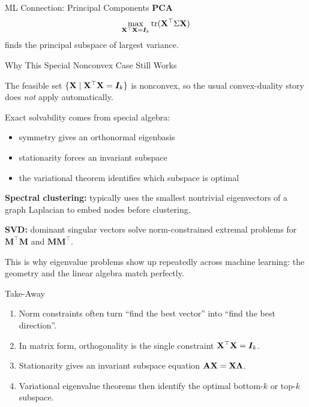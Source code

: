 \documentclass[11pt,compress,t,notes=noshow, xcolor=table]{beamer}
\newcommand{\Lambdamat}{\bm{\Lambda}}
\begin{document}
\begin{framev}[fs=small]{ML Connection: Principal Components}
\textbf{PCA}
$$
\max_{\mathbf{X}^\top \mathbf{X} = \bm{I}_k} \operatorname{tr}(\mathbf{X}^\top \Sigma \mathbf{X})
$$
finds the principal subspace of largest variance.\\
\spacer
{}
\end{framev}


\begin{framei}[fs=small]{Why This Special Nonconvex Case Still Works}
\item The feasible set $\{\mathbf{X} \mid \mathbf{X}^\top \mathbf{X} = \bm{I}_k\}$ is nonconvex, so the usual convex-duality story does \emph{not} apply automatically.
\item Exact solvability comes from special algebra:
\begin{itemize}
\item symmetry gives an orthonormal eigenbasis
\item stationarity forces an invariant subspace
\item the variational theorem identifies which subspace is optimal
\end{itemize}
\item \textbf{Spectral clustering:} typically uses the smallest nontrivial eigenvectors of a graph Laplacian to embed nodes before clustering.
\item \textbf{SVD:} dominant singular vectors solve norm-constrained extremal problems for $\mathbf{M}^\top \mathbf{M}$ and $\mathbf{M}\mathbf{M}^\top$.
\item This is why eigenvalue problems show up repeatedly across machine learning: the geometry and the linear algebra match perfectly.
\end{framei}


\begin{framev}{Take-Away}
\begin{enumerate}
\item Norm constraints often turn \enquote{find the best vector} into \enquote{find the best direction}.
\item In matrix form, orthogonality is the single constraint $\mathbf{X}^\top \mathbf{X} = \bm{I}_k$.
\item Stationarity gives an invariant subspace equation $\A \Xmat = \Xmat \Lambdamat$.
\item Variational eigenvalue theorems then identify the optimal bottom-$k$ or top-$k$ subspace.
\end{enumerate}
\vfill
{}
\end{framev}

\endlecture
\end{document}
